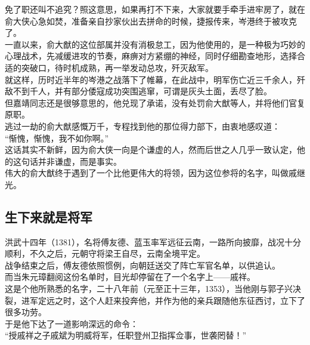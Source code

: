 \begin{multicols}{\theparacolNo}
免了职还叫不追究？照这意思，如果再打不下来，大家就要手牵手进牢房了，就在俞大侠心急如焚，准备亲自抄家伙出去拼命的时候，捷报传来，岑港终于被攻克了。\\

一直以来，俞大猷的这位部属并没有消极怠工，因为他使用的，是一种极为巧妙的心理战术，先减缓进攻的节奏，麻痹对方紧绷的神经，同时仔细勘查地形，选择合适的突破口，待时机成熟，再一举发动总攻，歼灭敌军。\\

就这样，历时近半年的岑港之战落下了帷幕，在此战中，明军伤亡近三千余人，歼敌不到千人，并有部分倭寇成功突围逃窜，可谓是灰头土面，丢尽了脸。\\

但嘉靖同志还是很够意思的，他兑现了承诺，没有处罚俞大猷等人，并将他们官复原职。\\

逃过一劫的俞大猷感慨万千，专程找到他的那位得力部下，由衷地感叹道：\\

“惭愧，惭愧，我不如你啊。”\\

这话其实不新鲜，因为俞大侠一向是个谦虚的人，然而后世之人几乎一致认定，他的这句话并非谦虚，而是事实。\\

伟大的俞大猷终于遇到了一个比他更伟大的将领，因为这位参将的名字，叫做戚继光。\\

\subsection{生下来就是将军}
洪武十四年（1381），名将傅友德、蓝玉率军远征云南，一路所向披靡，战况十分顺利，不久之后，元朝守将梁王自尽，云南全境平定。\\

战争结束之后，傅友德依照惯例，向朝廷送交了阵亡军官名单，以供追认。\\

而当朱元璋翻阅这份名单时，目光却停留在了一个名字上——戚祥。\\

这是个他所熟悉的名字，二十八年前（元至正十三年，1353），当他刚与郭子兴决裂，进军定远之时，这个人赶来投奔他，并作为他的亲兵跟随他东征西讨，立下了很多功劳。\\

于是他下达了一道影响深远的命令：\\

“授戚祥之子戚斌为明威将军，任职登州卫指挥佥事，世袭罔替！”\\


\end{multicols}
